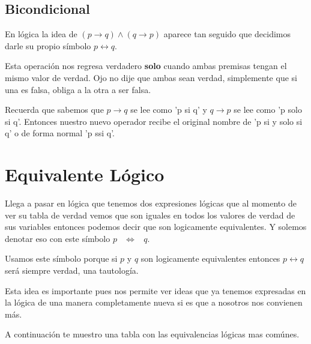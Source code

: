 \documentclass[12pt, fleqn]{report}                             %
\DeclareMathOperator \Space {\quad}                             %
\DeclareMathOperator \MiniSpace {\;}                            %
\DeclareMathOperator \doublearrow {\leftrightarrow}             %
\newcommand \lequal {\MiniSpace \Leftrightarrow \MiniSpace}     %
\begin{document}
            \clearpage
            \subsection{Bicondicional}

                En lógica la idea de $(p \to q ) \land (q \to p)$ aparece tan seguido que decidimos darle su
                propio símbolo $p \doublearrow q$.

                Esta operación nos regresa verdadero \textbf{solo} cuando ambas premisas tengan el mismo valor de
                verdad. Ojo no dije que ambas sean verdad, simplemente que si una es falsa, obliga a la otra a 
                ser falsa.

                Recuerda que sabemos que $p \to q$ se lee como 'p si q' y $q \to p$ se lee como 'p solo si q'.
                Entonces nuestro nuevo operador recibe el original nombre de 'p si y solo si q' o de forma normal
                'p ssi q'.



        \section{Equivalente Lógico}

            Llega a pasar en lógica que tenemos dos expresiones lógicas que al momento de ver su tabla de 
            verdad vemos que son iguales en todos los valores de verdad de sus variables entonces podemos
            decir que son logicamente equivalentes. Y solemos denotar eso con este símbolo $p \lequal q$.

            Usamos este símbolo porque si $p$ y $q$ son logicamente equivalentes entonces $p \doublearrow q$
            será siempre verdad, una tautología.

            Esta idea es importante pues nos permite ver ideas que ya tenemos expresadas en la lógica de una
            manera completamente nueva si es que a nosotros nos convienen más.

            A continuación te muestro una tabla con las equivalencias lógicas mas comúnes.
\end{document}
